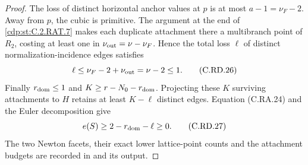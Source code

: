 \begin{proof}
The loss of distinct horizontal anchor values
at $p$ is at most $a-1=\nu_F-2$. Away from
$p$, the cubic is primitive. The argument at
the end of \ref{cdp:st:C.2.RAT.7} makes each duplicate
attachment there a multibranch point of $R_2$,
costing at least one in
$\nu_{\rm out}=\nu-\nu_F$. Hence the total
loss $\ell$ of distinct normalization-incidence
edges satisfies
\[
                    \ell\le\nu_F-2+\nu_{\rm out}
                              =\nu-2\le1.
\tag{C.RD.26}\label{cdp:eq:C.RD.26}
\]
Finally $r_{\rm dom}\le1$ and
$K\ge r-N_0-r_{\rm dom}$. Projecting these
$K$ surviving attachments to $H$ retains at
least $K-\ell$ distinct edges. Equation
(C.RA.24) and the Euler decomposition give
\[
                 e(S)\ge2-r_{\rm dom}-\ell\ge0.
\tag{C.RD.27}\label{cdp:eq:C.RD.27}
\]
The two Newton facets, their exact lower
lattice-point counts and the attachment
budgets are recorded in
 and its output.
\end{proof}


